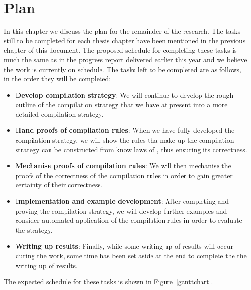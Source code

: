 \documentclass[a4paper,10pt]{report}
\let\olditem\item
\renewcommand{\item}[1][]{\olditem{\bfseries #1}}
\begin{document}
\chapter{Plan}
\label{plan-chapter}

In this chapter we discuss the plan for the remainder of the research.
The tasks still to be completed for each thesis chapter have been mentioned
in the previous chapter of this document.
The proposed schedule for completing these tasks is much the same as
in the progress report delivered earlier this year and we believe the
work is currently on schedule.
The tasks left to be completed are as follows, in the order they will
be completed:
\begin{itemize}
\item[Develop compilation strategy]: We will continue to develop the
  rough outline of the compilation strategy that we have at present
  into a more detailed compilation strategy.
\item[Hand proofs of compilation rules]: When we have fully developed
  the compilation strategy, we will show the rules tha make up the
  compilation strategy can be constructed from know laws of \Circus{},
  thus ensuring its correctness.
\item[Mechanise proofs of compilation rules]: We will then mechanise
  the proofs of the correctness of the compilation rules in order to
  gain greater certainty of their correctness.
\item[Implementation and example development]: After completing and
  proving the compilation strategy, we will develop further examples
  and consider automated application of the compilation rules in order
  to evaluate the strategy.
\item[Writing up results]: Finally, while some writing up of results
  will occur during the work, some time has been set aside at the end
  to complete the the writing up of results.
\end{itemize}
The expected schedule for these tasks is shown in
Figure~\ref{ganttchart}.
\end{document}
